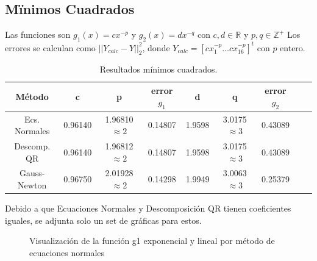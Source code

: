 \documentclass{endm}
\begin{document}
\subsection{Mïnimos Cuadrados}
Las funciones son $g_1(x)=c x^{-p} $ y $g_2(x)=d x^{-q} $ con $c,d \in \mathbb{R}$ y $p,q \in \mathbb{Z^+}$
Los errores se calculan como $||Y_{calc} - Y ||^2_2$, donde $Y_{calc} = [cx_1^{-p} \dots cx_{16}^{-p}]^t$ con $p$ entero.
\begin{table}[h!]
    \begin{center}
      \caption{Resultados mínimos cuadrados.}
      \label{tab:table1}
      \begin{tabular}{c|c|c|c|c|c|c|c|c} %
        \textbf{Método} & \textbf{c} & \textbf{p} & \textbf{error $g_1$} & \textbf{d} & \textbf{q} & \textbf{error $g_2$} \\
        \hline
        Ecs. Normales & 0.96140 & 1.96810 $\approx 2$ & 0.14807 & 1.9598 & 3.0175 $\approx 3$ & 0.43089 \\
        Descomp. QR   & 0.96140 & 1.96812 $\approx 2$ & 0.14807 & 1.9598 & 3.0175 $\approx 3$ & 0.43089 \\
        Gauss-Newton  & 0.96750 & 2.01928 $\approx 2$ & 0.14298 & 1.9949 & 3.0063 $\approx 3$ & 0.25379 \\
      \end{tabular}
    \end{center}
  \end{table}
\clearpage
Debido a que Ecuaciones Normales y Descomposición QR tienen coeficientes iguales, se adjunta solo un set de gráficas para estos.
\begin{figure}%
    \centering
    \qquad
    \caption{Visualización de la función g1 exponencial y lineal por método de ecuaciones normales}%
    \label{fig:example}%
\end{figure}
\end{document}
